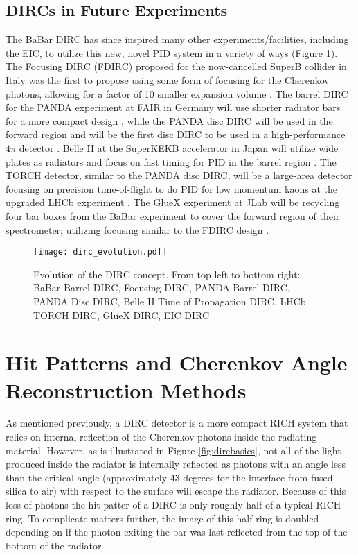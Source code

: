 \subsection{DIRCs in Future Experiments}
The BaBar DIRC has since inspired many other experiments/facilities, including the EIC, to utilize this new, novel PID system in a variety of ways (Figure \ref{fig:dirc_evolution}). The Focusing DIRC (FDIRC) proposed for the now-cancelled SuperB collider in Italy was the first to propose using some form of focusing for the Cherenkov photons, allowing for a factor of 10 smaller expansion volume \cite{FDIRC}. The barrel DIRC for the PANDA experiment at FAIR in Germany will use shorter radiator bars for a more compact design \cite{PANDA_barrel}, while the PANDA disc DIRC will be used in the forward region and will be the first disc DIRC to be used in a high-performance $4\pi$ detector \cite{PANDA_disc}. Belle II at the SuperKEKB accelerator in Japan will utilize wide plates as radiators and focus on fast timing for PID in the barrel region \cite{Belle2_TOP}. The TORCH detector, similar to the PANDA disc DIRC, will be a large-area detector focusing on precision time-of-flight to do PID for low momentum kaons at the upgraded LHCb experiment \cite{TORCH}. The GlueX experiment at JLab will be recycling four bar boxes from the BaBar experiment to cover the forward region of their spectrometer; utilizing  focusing similar to the FDIRC design \cite{GlueX}.

\begin{figure}[ht]
	\centering
	\texttt{[image: dirc\_evolution.pdf]}
	\caption{Evolution of the DIRC concept. From top left to bottom right: BaBar Barrel DIRC, Focusing DIRC, PANDA Barrel DIRC, PANDA Disc DIRC, Belle II Time of Propagation DIRC, LHCb TORCH DIRC, GlueX DIRC, EIC DIRC}
	\label{fig:dirc_evolution}
\end{figure}

\section{Hit Patterns and Cherenkov Angle Reconstruction Methods}
As mentioned previously, a DIRC detector is a more compact RICH system that relies on internal reflection of the Cherenkov photons inside the radiating material. However, as is illustrated in Figure \ref{fig:dircbasics}, not all of the light produced inside the radiator is internally reflected as photons with an angle less than the critical angle (approximately 43 degrees for the interface from fused silica to air) with respect to the surface will escape the radiator. Because of this loss of photons the hit patter of a DIRC is only roughly half of a typical RICH ring. To complicate matters further, the image of this half ring is doubled depending on if the photon exiting the bar was last reflected from the top of the bottom of the radiator 
